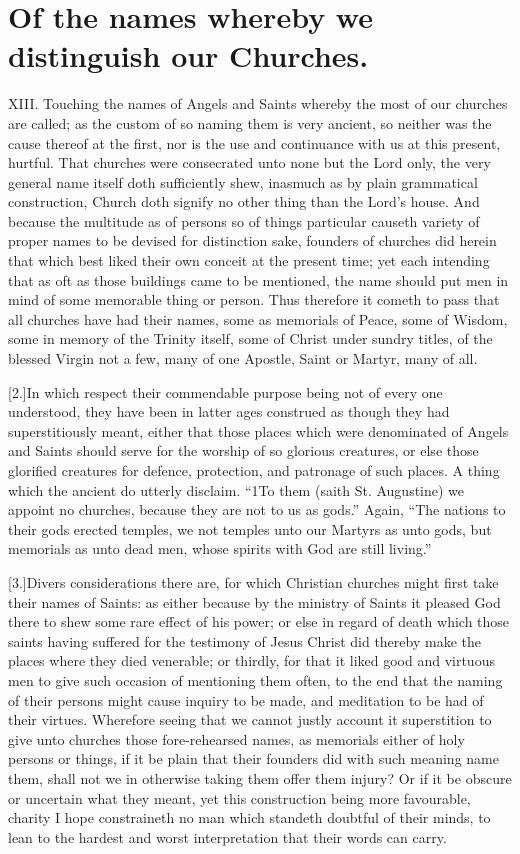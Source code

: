\section*{Of the names whereby we distinguish our Churches.}
XIII. Touching the names of Angels and Saints whereby the most of our churches are called; as the custom of so naming them is very ancient, so neither was the cause thereof at the first, nor is the use and continuance with us at this present, hurtful. That churches were consecrated unto none but the Lord only, the very general name itself doth sufficiently shew, inasmuch as by plain grammatical construction, Church doth signify no other thing than the Lord’s house. And because the multitude as of persons so of things particular causeth variety of proper names to be devised for distinction sake, founders of churches did herein that which best liked their own conceit at the present time; yet each intending that as oft as those buildings came to be mentioned, the name should put men in mind of some memorable thing or person. Thus therefore it cometh to pass that all churches have had their names, some as memorials of Peace, some of Wisdom, some in memory of the Trinity itself, some of Christ under sundry titles, of the blessed Virgin not a few, many of one Apostle, Saint or Martyr, many of all.

[2.]In which respect their commendable purpose being not of every one understood, they have been in latter ages construed as though they had superstitiously meant, either that those places which were denominated of Angels and Saints should serve for the worship of so glorious creatures, or else those glorified creatures for defence, protection, and  patronage of such places. A thing which the ancient do utterly disclaim.
 “1To them (saith St. Augustine) we appoint no churches, because they are not to us as gods.” Again, “The nations to their gods erected temples, we not temples unto our Martyrs as unto gods, but memorials as unto dead men, whose spirits with God are still living.”

[3.]Divers considerations there are, for which Christian churches might first take their names of Saints: as either because by the ministry of Saints it pleased God there to shew some rare effect of his power; or else in regard of death which those saints having suffered for the testimony of Jesus Christ did thereby make the places where they died venerable; or thirdly, for that it liked good and virtuous men to give such occasion of mentioning them often, to the end that the naming of their persons might cause inquiry to be made, and meditation to be had of their virtues. Wherefore seeing that we cannot justly account it superstition to give unto churches those fore-rehearsed names, as memorials either of holy persons or things, if it be plain that their founders did with such meaning name them, shall not we in otherwise taking them offer them injury? Or if it be obscure or uncertain what they meant, yet this construction being more  favourable, charity I hope constraineth no man which standeth doubtful of their minds, to lean to the hardest and worst interpretation that their words can carry.


